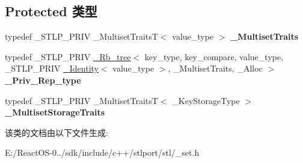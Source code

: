 \subsection*{Protected 类型}
\begin{DoxyCompactItemize}
\item 
\mbox{\label{classmultiset_a911fcaef982c0a210e2d6149ad6b3b2c}} 
typedef \+\_\+\+S\+T\+L\+P\+\_\+\+P\+R\+IV \+\_\+\+Multiset\+TraitsT$<$ value\+\_\+type $>$ {\bfseries \+\_\+\+Multiset\+Traits}
\item 
\mbox{\label{classmultiset_af5a006a8035f5090f16a2157a7d6aac4}} 
typedef \+\_\+\+S\+T\+L\+P\+\_\+\+P\+R\+IV \hyperlink{class___rb__tree}{\+\_\+\+Rb\+\_\+tree}$<$ key\+\_\+type, key\+\_\+compare, value\+\_\+type, \+\_\+\+S\+T\+L\+P\+\_\+\+P\+R\+IV \hyperlink{struct___identity}{\+\_\+\+Identity}$<$ value\+\_\+type $>$, \+\_\+\+Multiset\+Traits, \+\_\+\+Alloc $>$ {\bfseries \+\_\+\+Priv\+\_\+\+Rep\+\_\+type}
\item 
\mbox{\label{classmultiset_ad43d68f5b12c2b45e8f2104d4a83fdcf}} 
typedef \+\_\+\+S\+T\+L\+P\+\_\+\+P\+R\+IV \+\_\+\+Multiset\+TraitsT$<$ \+\_\+\+Key\+Storage\+Type $>$ {\bfseries \+\_\+\+Multiset\+Storage\+Traits}
\end{DoxyCompactItemize}


该类的文档由以下文件生成\+:\begin{DoxyCompactItemize}
\item 
E\+:/\+React\+O\+S-\/0../sdk/include/c++/stlport/stl/\+\_\+set.\+h\end{DoxyCompactItemize}
